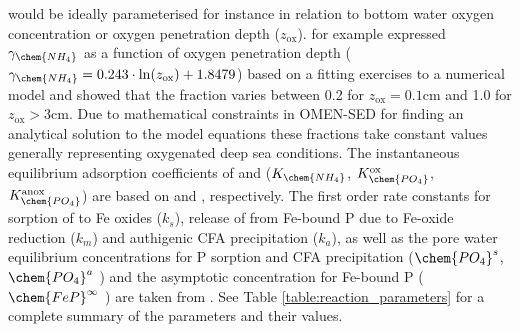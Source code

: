\documentclass[gmd, manuscript]{copernicus}
\begin{document}
would be ideally parameterised for instance in relation to bottom water oxygen concentration or oxygen penetration depth ($z_{\mathrm{ox}}$). 
\citet{gypens_simple_2008} for example expressed $\gamma_{\chem{NH_4}}$ as a function of oxygen penetration depth ($\gamma_{\chem{NH_4}} = 0.243 \cdot \mathrm{ln}(z_{\mathrm{ox}}) + 1.8479$) 
based on a fitting exercises to a numerical model and showed that the fraction varies between 0.2 for $z_{\mathrm{ox}}=0.1$cm and 1.0 for $z_{\mathrm{ox}}>3$cm. 
Due to mathematical constraints in OMEN-SED for finding an analytical solution to the model equations these fractions take constant values generally representing oxygenated deep sea conditions. 
The instantaneous equilibrium adsorption coefficients of  and  ($K_{\chem{NH_4}}$, $K_\chem{PO_4}^{\mathrm{ox}}$, $K_\chem{PO_4}^{\mathrm{anox}}$) are based on \citet{wang_multicomponent_1996} and \citet{slomp1998role}, respectively.
The first order rate constants for sorption of  to Fe oxides ($k_s$), release of  from Fe-bound P due to Fe-oxide reduction ($k_m$) and 
authigenic CFA precipitation ($k_a$), as well as the pore water equilibrium concentrations for P sorption and CFA precipitation 
($\chem{PO_4}^s$, $\chem{PO_4}^a$ ) and the asymptotic concentration for Fe-bound P ($\chem{FeP}^\infty$ ) are taken from  \citet{caroline_p_slomp_key_1996}. 
See Table \ref{table:reaction_parameters} for a complete summary of the parameters and their values.

\end{document}
